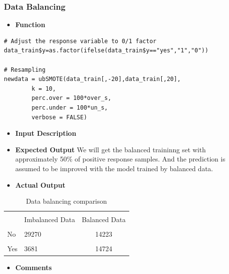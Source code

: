        \subsubsection{Data Balancing}
       \begin{itemize}
       	\item \textbf{Function}
       \end{itemize}
\begin{lstlisting}
# Adjust the response variable to 0/1 factor
data_train$y=as.factor(ifelse(data_train$y=="yes","1","0"))

# Resampling
newdata = ubSMOTE(data_train[,-20],data_train[,20], 
		k = 10, 
		perc.over = 100*over_s, 
		perc.under = 100*un_s,
		verbose = FALSE)
\end{lstlisting}
\begin{itemize}
	\item \textbf{Input Description}
\end{itemize}
   		\begin{itemize}
   		\item \textbf{Expected Output}
   		We will get the balanced traininng set with approximately 50\% of positive response samples. And the prediction is assumed to be improved with the model trained by balanced data.  
   		\end{itemize}
   	   	\begin{itemize}
   		\item \textbf{Actual Output}
   		\end{itemize}
   	  \begin{center}
   		\begin{table}[!htbp]
   			\centering  
   			\begin{tabular}{llc}
   				\hline
   				\hline\\[-1.8ex]

   				 & Imbalanced Data & Balanced Data \\
   				\hline \\[-1.8ex] 
   				No &  29270 & 14223  \\ 
   				\hline \\[-1.8ex] 
   				Yes&  3681 & 14724 \\ 
   				\hline
   				\hline
   			\end{tabular}  
   			\caption{Data balancing comparison} 
   		\end{table}
   	\end{center}
   	   	\begin{itemize}
		\item \textbf{Comments}
		\end{itemize}
